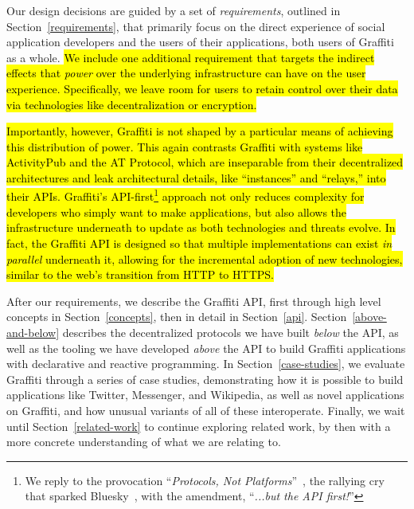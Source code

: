 
Our design decisions are guided by a set of \emph{requirements}, outlined
in Section~\ref{requirements}, that primarily focus on the direct experience
of social application developers and the users of their applications,
both users of Graffiti as a whole.
\hl{%
We include one additional requirement that targets the indirect
effects that \emph{power} over the underlying infrastructure
can have on the user experience.
Specifically, we leave room for users to retain control over their data
via technologies like decentralization or encryption.
}%

\hl{%
Importantly, however, Graffiti is not shaped by a particular
means of achieving this distribution of power. This again contrasts Graffiti
with systems like ActivityPub and the AT Protocol,
which are inseparable from their decentralized architectures
and leak architectural details, like ``instances'' and ``relays,''
into their APIs.
Graffiti's API-first\footnote{
We reply to the provocation ``\emph{Protocols, Not Platforms}''~{\cite{protocolsnotplatforms}},
the rallying cry that sparked Bluesky~{\cite{bluesky_from_protocols}},
with the amendment, ``\emph{...but the API first!}''
} approach not only reduces complexity for
developers who simply want to make applications,
but also allows the infrastructure underneath
to update as both technologies and threats evolve.
In fact, the Graffiti API is designed so that multiple implementations can exist
\emph{in parallel} underneath it,
allowing for the incremental adoption of new technologies,
similar to the web's transition from HTTP to HTTPS.
}%

After our requirements, we describe the Graffiti API,
first through high level concepts in Section~\ref{concepts},
then in detail in Section~\ref{api}.
Section~\ref{above-and-below} describes
the decentralized protocols we have built \emph{below} the API,
as well as the tooling we have developed \emph{above} the API
to build Graffiti applications with declarative and reactive programming.
In Section~\ref{case-studies},
we evaluate Graffiti through a series of case studies, demonstrating
how it is possible to build applications like Twitter, Messenger, and
Wikipedia, as well as novel applications on Graffiti, and how unusual
variants of all of these interoperate.
Finally, we wait until Section~\ref{related-work}
to continue exploring related work, by then with a more concrete
understanding of what we are relating to.

